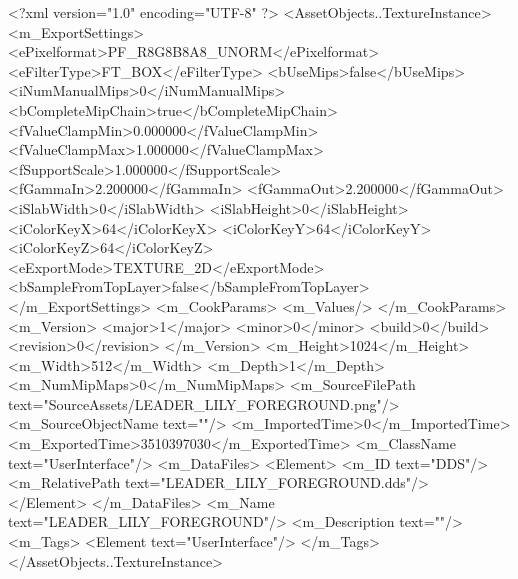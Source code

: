 <?xml version="1.0" encoding="UTF-8" ?>
<AssetObjects..TextureInstance>
	<m_ExportSettings>
		<ePixelformat>PF_R8G8B8A8_UNORM</ePixelformat>
		<eFilterType>FT_BOX</eFilterType>
		<bUseMips>false</bUseMips>
		<iNumManualMips>0</iNumManualMips>
		<bCompleteMipChain>true</bCompleteMipChain>
		<fValueClampMin>0.000000</fValueClampMin>
		<fValueClampMax>1.000000</fValueClampMax>
		<fSupportScale>1.000000</fSupportScale>
		<fGammaIn>2.200000</fGammaIn>
		<fGammaOut>2.200000</fGammaOut>
		<iSlabWidth>0</iSlabWidth>
		<iSlabHeight>0</iSlabHeight>
		<iColorKeyX>64</iColorKeyX>
		<iColorKeyY>64</iColorKeyY>
		<iColorKeyZ>64</iColorKeyZ>
		<eExportMode>TEXTURE_2D</eExportMode>
		<bSampleFromTopLayer>false</bSampleFromTopLayer>
	</m_ExportSettings>
	<m_CookParams>
		<m_Values/>
	</m_CookParams>
	<m_Version>
		<major>1</major>
		<minor>0</minor>
		<build>0</build>
		<revision>0</revision>
	</m_Version>
	<m_Height>1024</m_Height>
	<m_Width>512</m_Width>
	<m_Depth>1</m_Depth>
	<m_NumMipMaps>0</m_NumMipMaps>
	<m_SourceFilePath text="SourceAssets/LEADER_LILY_FOREGROUND.png"/>
	<m_SourceObjectName text=""/>
	<m_ImportedTime>0</m_ImportedTime>
	<m_ExportedTime>3510397030</m_ExportedTime>
	<m_ClassName text="UserInterface"/>
	<m_DataFiles>
		<Element>
			<m_ID text="DDS"/>
			<m_RelativePath text="LEADER_LILY_FOREGROUND.dds"/>
		</Element>
	</m_DataFiles>
	<m_Name text="LEADER_LILY_FOREGROUND"/>
	<m_Description text=""/>
	<m_Tags>
		<Element text="UserInterface"/>
	</m_Tags>
</AssetObjects..TextureInstance>

